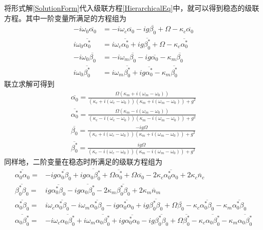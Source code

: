 将形式解\eqref{SolutionForm}代入级联方程\eqref{HierarchicalEq}中，就可以得到稳态的级联方程。其中一阶变量所满足的方程组为
\begin{equation}
\begin{aligned}
-i\omega_{0}\overline{\alpha_{0}}&=-i\omega_{c}\overline{\alpha_{0}}-ig\overline{\beta_{0}}+\Omega-\kappa_{c}\overline{\alpha_{0}} \\
i\omega_{0}\overline{\alpha^{*}_{0}}&=i\omega_{c}\overline{\alpha^{*}_{0}}+ig\overline{\beta^{*}_{0}}+\Omega-\kappa_{c}\overline{\alpha^{*}_{0}} \\
-i\omega_{0}\overline{\beta_{0}}&=-i\omega_{m}\overline{\beta_{0}}-ig\overline{\alpha_{0}}-\kappa_{m}\overline{\beta_{0}} \\
i\omega_{0}\overline{\beta^{*}_{0}}&=i\omega_{m}\overline{\beta^{*}_{0}}+ig\overline{\alpha^{*}_{0}}-\kappa_{m}\overline{\beta^{*}_{0}} \label{1odeqs}
\end{aligned}
\end{equation}
联立求解可得到
\begin{equation}
\begin{aligned}
\overline{\alpha_{0}} = \frac{\Omega(\kappa_{m}+i(\omega_{m}-\omega_{0}))}{(\kappa_{c}+i(\omega_{c}-\omega_{0}))(\kappa_{m}+i(\omega_{m}-\omega_{0}))+g^{2}} \\
\overline{\alpha^{*}_{0}} = \frac{\Omega(\kappa_{m}-i(\omega_{m}-\omega_{0}))}{(\kappa_{c}-i(\omega_{c}-\omega_{0}))(\kappa_{m}-i(\omega_{m}-\omega_{0}))+g^{2}} \\
\overline{\beta_{0}} = \frac{-ig\Omega}{(\kappa_{c}+i(\omega_{c}-\omega_{0}))(\kappa_{m}+i(\omega_{m}-\omega_{0}))+g^{2}} \\ 
\overline{\beta^{*}_{0}} = \frac{ig\Omega}{(\kappa_{c}-i(\omega_{c}-\omega_{0}))(\kappa_{m}-i(\omega_{m}-\omega_{0}))+g^{2}} 
\end{aligned}\label{first_order}
\end{equation}
同样地，二阶变量在稳态时所满足的级联方程组为
\begin{equation}
\begin{aligned}
{\overline{\alpha^{*}_0\alpha_0}}={}&-ig\overline{\alpha^{*}_0\beta_0}+ig\overline{\alpha_0\beta_0^{*}}+\Omega \overline{\alpha^{*}_0}+\Omega \overline{\alpha_0}-2\kappa_{c}\overline{\alpha^{*}_0\alpha_0}
+2\kappa_{c}\overline{n}_{c} \\
{\overline{\beta_0^{*}\beta_0}}={}&ig\overline{\alpha^{*}_0\beta_0} -ig\overline{\alpha_0\beta_0^{*}} -2\kappa_{m}\overline{\beta_0^{*}\beta_0}
+2\kappa_{m}\overline{n}_{m} \\
{\overline{\alpha^{*}_0\beta_0}}={}&i\omega_{c}\overline{\alpha^{*}_0\beta_0} -i\omega_{m}\overline{\alpha^{*}_0\beta_0} -ig\overline{\alpha^{*}_0\alpha_0}+ig\overline{\beta_0^{*}\beta_0}+\Omega \overline{\beta_0}-\kappa_{c}\overline{\alpha^{*}_0\beta_0}-\kappa_{m}\overline{\alpha^{*}_0\beta_0} \\
{\overline{\alpha_0\beta_0^{*}}}={}&-i\omega_{c}\overline{\alpha_0\beta_0^{*}}+i\omega_{m}\overline{\alpha_0\beta_0^{*}}
+ig\overline{\alpha^{*}_0\alpha_0}-ig\overline{\beta_0^{*}\beta_0}+\Omega \overline{\beta_0^{*}}-\kappa_{c}\overline{\alpha_0\beta_0^{*}}-\kappa_{m}\overline{\alpha_0\beta_0^{*}}
\end{aligned}
\end{equation}
